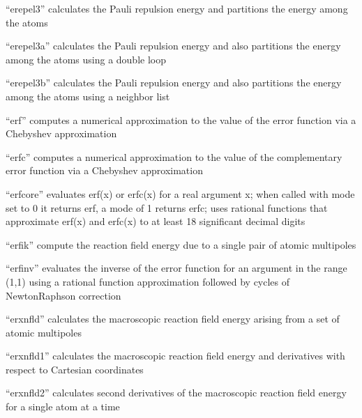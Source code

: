 \documentclass[letterpaper,11pt,english]{sphinxmanual}
\begin{document}

“erepel3” calculates the Pauli repulsion energy and partitions
the energy among the atoms


“erepel3a” calculates the Pauli repulsion energy and also
partitions the energy among the atoms using a double loop


“erepel3b” calculates the Pauli repulsion energy and also
partitions the energy among the atoms using a neighbor list


“erf” computes a numerical approximation to the value of
the error function via a Chebyshev approximation


“erfc” computes a numerical approximation to the value of the
complementary error function via a Chebyshev approximation


“erfcore” evaluates erf(x) or erfc(x) for a real argument x;
when called with mode set to 0 it returns erf, a mode of 1
returns erfc; uses rational functions that approximate erf(x)
and erfc(x) to at least 18 significant decimal digits


“erfik” compute the reaction field energy due to a single pair
of atomic multipoles


“erfinv” evaluates the inverse of the error function for
an argument in the range (\sphinxhyphen{}1,1) using a rational function
approximation followed by cycles of Newton\sphinxhyphen{}Raphson correction


“erxnfld” calculates the macroscopic reaction field energy
arising from a set of atomic multipoles


“erxnfld1” calculates the macroscopic reaction field energy
and derivatives with respect to Cartesian coordinates


“erxnfld2” calculates second derivatives of the macroscopic
reaction field energy for a single atom at a time
\end{document}
